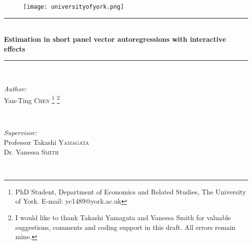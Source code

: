 \documentclass[12pt,a4paper,hyperref]{article}
\begin{document}
\begin{titlepage}

\newcommand{\HRule}{\rule{\linewidth}{0.5mm}} %

\center %

\begin{figure}
\centering
\texttt{[image: universityofyork.png]}
\end{figure}



\HRule \\[0.4cm]
{ \huge \bfseries Estimation in short panel vector autoregressions  with interactive effects}\\[0.4cm] %
\HRule \\[1.5cm]


\begin{minipage}{0.4\textwidth}
\begin{flushleft} \normalsize
\emph{Author:}\\
Yan-Ting \textsc{Chen} \thanks{PhD Student, Department of Economics and Related Studies, The University of York. E-mail: yc1489@york.ac.uk} \thanks{I would like to thank Takashi Yamagata and Vanessa Smith for valuable suggestions, comments and coding support in this draft. All errors remain mine. } %
\end{flushleft}
\end{minipage}
~
\begin{minipage}{0.4\textwidth}
\begin{flushright} \normalsize
\emph{Supervisor:} \\
Professor Takashi \textsc{Yamagata} \\
Dr. Vanessa \textsc{Smith}   %
\end{flushright}
\end{minipage}\\[2cm]


\end{titlepage}
\end{document}
